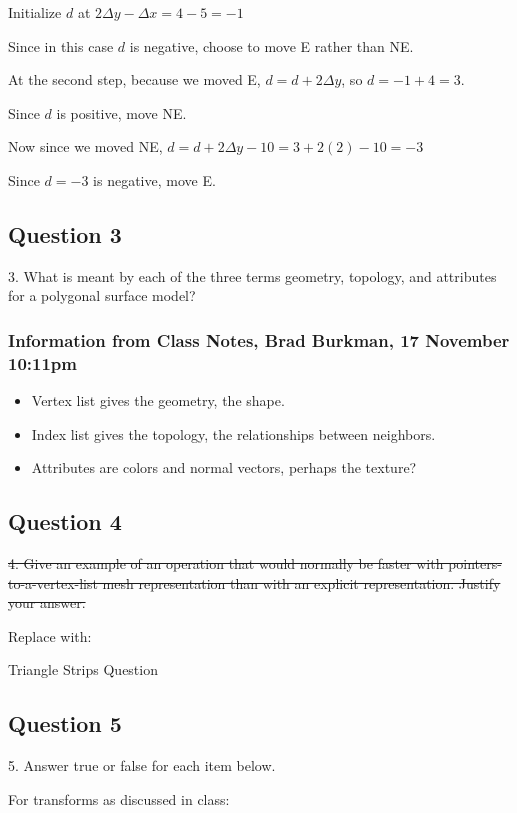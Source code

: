 \documentclass[11pt]{article}
\begin{document}
\begin{spacing}{1.2}
Initialize $d$ at $2\Delta y - \Delta x = 4-5 = -1$  

Since in this case $d$ is negative, choose to move E rather than NE.  

At the second step, because we moved E, $d = d+2\Delta y$, so $d = -1 + 4 = 3$.  

Since $d$ is positive, move NE.  

Now since we moved NE, $d = d+2 \Delta y - 10 = 3 + 2(2) - 10 = -3$

Since $d = -3$ is negative, move E.



\subsection{Question 3}
3.  What is meant by each of the three terms geometry, topology, and attributes for a polygonal surface model?

\subsubsection{Information from Class Notes, Brad Burkman, 17 November 10:11pm}

\begin{itemize}
	\item Vertex list gives the geometry, the shape.  
	\item Index list gives the topology, the relationships between neighbors.  
	\item Attributes are colors and normal vectors, perhaps the texture?
\end{itemize}

\subsection{Question 4}

\sout{4.  Give an example of an operation that would normally be faster with pointers-to-a-vertex-list mesh representation than with an explicit representation.  Justify your answer.  }

Replace with:

Triangle Strips Question

\subsection{Question 5}
5.  Answer true or false for each item below.  

For transforms as discussed in class:


\end{spacing}
\end{document}
